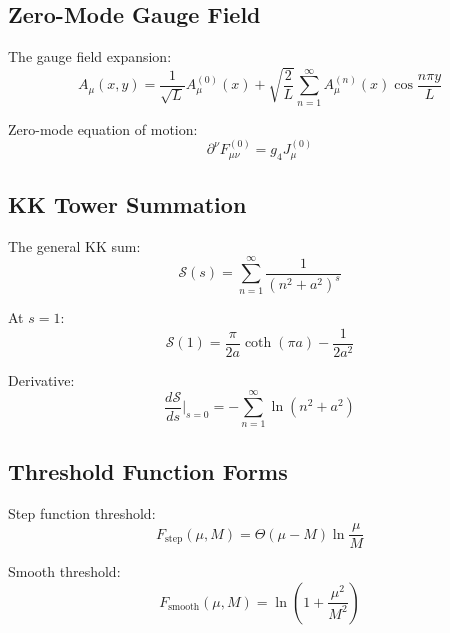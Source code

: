 \documentclass[11pt,a4paper]{article}
\theoremstyle{definition}
\begin{document}
\subsection{Zero-Mode Gauge Field}
\label{subsec:zero-mode-gauge}

The gauge field expansion:
\begin{equation}
\label{eq:gauge-expansion}
A_\mu(x,y) = \frac{1}{\sqrt{L}} A_\mu^{(0)}(x) + \sqrt{\frac{2}{L}} \sum_{n=1}^{\infty} A_\mu^{(n)}(x) \cos\frac{n\pi y}{L}
\end{equation}

Zero-mode equation of motion:
\begin{equation}
\label{eq:zero-mode-eom}
\partial^\nu F_{\mu\nu}^{(0)} = g_4 J_\mu^{(0)}
\end{equation}

\subsection{KK Tower Summation}
\label{subsec:kk-tower-sum}

The general KK sum:
\begin{equation}
\label{eq:kk-general-sum}
\mathcal{S}(s) = \sum_{n=1}^{\infty} \frac{1}{(n^2 + a^2)^s}
\end{equation}

At $s = 1$:
\begin{equation}
\label{eq:kk-s1}
\mathcal{S}(1) = \frac{\pi}{2a} \coth(\pi a) - \frac{1}{2a^2}
\end{equation}

Derivative:
\begin{equation}
\label{eq:kk-derivative}
\frac{d\mathcal{S}}{ds}\bigg|_{s=0} = -\sum_{n=1}^{\infty} \ln(n^2 + a^2)
\end{equation}

\subsection{Threshold Function Forms}
\label{subsec:threshold-forms}

Step function threshold:
\begin{equation}
\label{eq:step-threshold}
F_{\text{step}}(\mu, M) = \Theta(\mu - M) \ln\frac{\mu}{M}
\end{equation}

Smooth threshold:
\begin{equation}
\label{eq:smooth-threshold}
F_{\text{smooth}}(\mu, M) = \ln\left(1 + \frac{\mu^2}{M^2}\right)
\end{equation}
\end{document}
